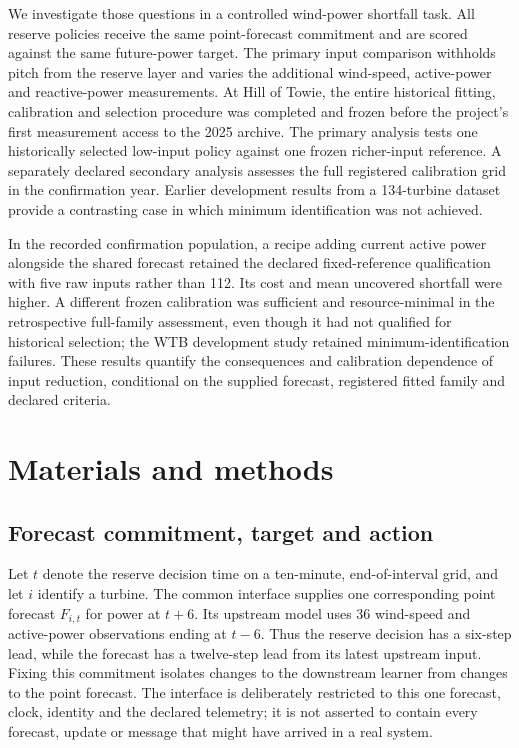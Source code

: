 \documentclass[
  british,
  11pt,
]{article}
\begin{document}
We investigate those questions in a controlled wind-power shortfall
task. All reserve policies receive the same point-forecast commitment
and are scored against the same future-power target. The primary input
comparison withholds pitch from the reserve layer and varies the
additional wind-speed, active-power and reactive-power measurements. At
Hill of Towie, the entire historical fitting, calibration and selection
procedure was completed and frozen before the project's first
measurement access to the 2025 archive. The primary analysis tests one
historically selected low-input policy against one frozen richer-input
reference. A separately declared secondary analysis assesses the full
registered calibration grid in the confirmation year. Earlier
development results from a 134-turbine dataset provide a contrasting
case in which minimum identification was not achieved.

In the recorded confirmation population, a recipe adding current active
power alongside the shared forecast retained the declared
fixed-reference qualification with five raw inputs rather than 112. Its
cost and mean uncovered shortfall were higher. A different frozen
calibration was sufficient and resource-minimal in the retrospective
full-family assessment, even though it had not qualified for historical
selection; the WTB development study retained minimum-identification
failures. These results quantify the consequences and calibration
dependence of input reduction, conditional on the supplied forecast,
registered fitted family and declared criteria.

\section{Materials and methods}\label{materials-and-methods}

\subsection{Forecast commitment, target and
action}\label{forecast-commitment-target-and-action}

Let \(t\) denote the reserve decision time on a ten-minute,
end-of-interval grid, and let \(i\) identify a turbine. The common
interface supplies one corresponding point forecast \(F_{i,t}\) for
power at \(t+6\). Its upstream model uses 36 wind-speed and active-power
observations ending at \(t-6\). Thus the reserve decision has a six-step
lead, while the forecast has a twelve-step lead from its latest upstream
input. Fixing this commitment isolates changes to the downstream learner
from changes to the point forecast. The interface is deliberately
restricted to this one forecast, clock, identity and the declared
telemetry; it is not asserted to contain every forecast, update or
message that might have arrived in a real system.
\end{document}
